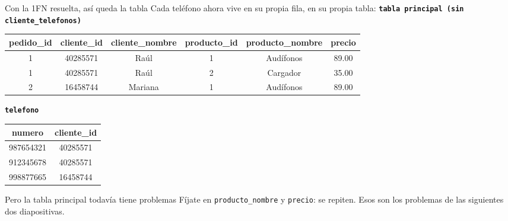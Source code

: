 \documentclass[aspectratio=169,10pt,c]{beamer}
\newenvironment{tablaventa}{\footnotesize\setlength\tabcolsep{4.5pt}}{}
\newcommand{\tblb}[1]{\textcolor{utpNaranja}{\textbf{\texttt{#1}}}}
\begin{document}
\begin{frame}{Con la 1FN resuelta, así queda la tabla}
\small Cada teléfono ahora vive en su propia fila, en su propia tabla:
\vspace{0.2cm}
\centering\footnotesize\texttt{\textbf{tabla principal (sin \texttt{cliente\_telefonos})}}\\[2pt]
\begin{center}
\begin{tablaventa}
\begin{tabular}{cccccc}
\toprule
\bfseries pedido\_id & \bfseries cliente\_id & \bfseries cliente\_nombre & \bfseries producto\_id & \bfseries producto\_nombre & \bfseries precio \\
\midrule
1 & 40285571 & Raúl & 1 & Audífonos & 89.00 \\
1 & 40285571 & Raúl & 2 & Cargador  & 35.00 \\
2 & 16458744 & Mariana & 1 & Audífonos & 89.00 \\
\bottomrule
\end{tabular}
\end{tablaventa}
\end{center}
\vspace{0.2cm}
\centering\footnotesize\tblb{telefono}\\[2pt]
\begin{center}
\footnotesize
\begin{tabular}{cc}
\toprule
\bfseries numero & \bfseries cliente\_id \\
\midrule
987654321 & 40285571 \\
912345678 & 40285571 \\
998877665 & 16458744 \\
\bottomrule
\end{tabular}
\end{center}
\vspace{0.15cm}
\begin{alertblock}{Pero la tabla principal todavía tiene problemas}
\small Fíjate en \texttt{producto\_nombre} y \texttt{precio}: se repiten. Esos son los problemas de las siguientes dos diapositivas.
\end{alertblock}
\end{frame}
\end{document}
